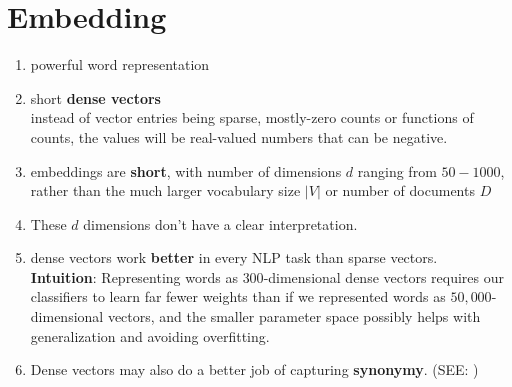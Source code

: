 \section{Embedding \cite{nlp-1}}\label{Embedding}
\begin{enumerate}
    \item powerful word representation
    
    \item short \textbf{dense vectors} \\
    instead of vector entries being sparse, mostly-zero counts or functions of counts, the values will be real-valued numbers that can be negative.

    \item embeddings are \textbf{short}, with number of dimensions $d$ ranging from $50-1000$, rather than the much larger vocabulary size $|V|$ or number of documents $D$

    \item These $d$ dimensions don’t have a clear interpretation.

    \item dense vectors work \textbf{better} in every NLP task than sparse vectors.\\
    \textbf{Intuition}: Representing words as $300$-dimensional dense vectors requires our classifiers to learn far fewer weights than if we represented words as $50,000$-dimensional vectors, and the smaller parameter space possibly helps with generalization and avoiding overfitting.

    \item Dense vectors may also do a better job of capturing \textbf{synonymy}. (SEE: )

    
\end{enumerate}

